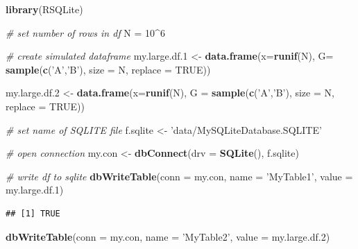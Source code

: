 \documentclass[11pt,]{book}
\newenvironment{Shaded}{\begin{snugshade}}{\end{snugshade}}
\newcommand{\KeywordTok}[1]{\textcolor[rgb]{0.27,0.27,0.27}{\textbf{#1}}}
\newcommand{\DataTypeTok}[1]{\textcolor[rgb]{0.27,0.27,0.27}{#1}}
\newcommand{\DecValTok}[1]{\textcolor[rgb]{0.06,0.06,0.06}{#1}}
\newcommand{\StringTok}[1]{\textcolor[rgb]{0.5,0.5,0.5}{#1}}
\newcommand{\CommentTok}[1]{\textcolor[rgb]{0.56,0.35,0.01}{\textit{#1}}}
\newcommand{\OtherTok}[1]{\textcolor[rgb]{0.56,0.35,0.01}{#1}}
\newcommand{\OperatorTok}[1]{\textcolor[rgb]{0.81,0.36,0.00}{\textbf{#1}}}
\newcommand{\NormalTok}[1]{#1}
\begin{document}
\begin{Shaded}
\begin{Highlighting}[]
\KeywordTok{library}\NormalTok{(RSQLite)}

\CommentTok{# set number of rows in df}
\NormalTok{N =}\StringTok{ }\DecValTok{10}\OperatorTok{^}\DecValTok{6} 

\CommentTok{# create simulated dataframe}
\NormalTok{my.large.df.}\DecValTok{1}\NormalTok{ <-}\StringTok{ }\KeywordTok{data.frame}\NormalTok{(}\DataTypeTok{x=}\KeywordTok{runif}\NormalTok{(N), }
                            \DataTypeTok{G=} \KeywordTok{sample}\NormalTok{(}\KeywordTok{c}\NormalTok{(}\StringTok{'A'}\NormalTok{,}\StringTok{'B'}\NormalTok{),}
                                      \DataTypeTok{size =}\NormalTok{ N,}
                                      \DataTypeTok{replace =} \OtherTok{TRUE}\NormalTok{))}

\NormalTok{my.large.df.}\DecValTok{2}\NormalTok{ <-}\StringTok{ }\KeywordTok{data.frame}\NormalTok{(}\DataTypeTok{x=}\KeywordTok{runif}\NormalTok{(N), }
                            \DataTypeTok{G =} \KeywordTok{sample}\NormalTok{(}\KeywordTok{c}\NormalTok{(}\StringTok{'A'}\NormalTok{,}\StringTok{'B'}\NormalTok{),}
                                       \DataTypeTok{size =}\NormalTok{ N,}
                                       \DataTypeTok{replace =} \OtherTok{TRUE}\NormalTok{))}

\CommentTok{# set name of SQLITE file}
\NormalTok{f.sqlite <-}\StringTok{ 'data/MySQLiteDatabase.SQLITE'}

\CommentTok{# open connection}
\NormalTok{my.con <-}\StringTok{ }\KeywordTok{dbConnect}\NormalTok{(}\DataTypeTok{drv =} \KeywordTok{SQLite}\NormalTok{(), f.sqlite)}

\CommentTok{# write df to sqlite}
\KeywordTok{dbWriteTable}\NormalTok{(}\DataTypeTok{conn =}\NormalTok{ my.con, }\DataTypeTok{name =} \StringTok{'MyTable1'}\NormalTok{, }\DataTypeTok{value =}\NormalTok{ my.large.df.}\DecValTok{1}\NormalTok{)}
\end{Highlighting}
\end{Shaded}

\begin{verbatim}
## [1] TRUE
\end{verbatim}

\begin{Shaded}
\begin{Highlighting}[]
\KeywordTok{dbWriteTable}\NormalTok{(}\DataTypeTok{conn =}\NormalTok{ my.con, }\DataTypeTok{name =} \StringTok{'MyTable2'}\NormalTok{, }\DataTypeTok{value =}\NormalTok{ my.large.df.}\DecValTok{2}\NormalTok{)}
\end{Highlighting}
\end{Shaded}
\end{document}
